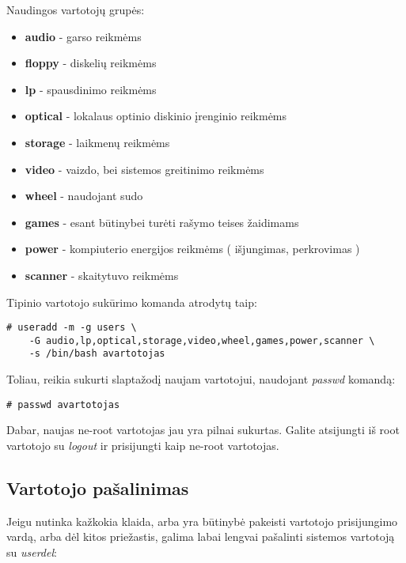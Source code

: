   Naudingos vartotojų grupės:

  \begin{itemize}
    \item \textbf{audio} - garso reikmėms
    \item \textbf{floppy} - diskelių reikmėms
    \item \textbf{lp} - spausdinimo reikmėms
    \item \textbf{optical} - lokalaus optinio diskinio įrenginio
      reikmėms
    \item \textbf{storage} - laikmenų reikmėms
    \item \textbf{video} - vaizdo, bei sistemos greitinimo reikmėms
    \item \textbf{wheel} - naudojant sudo
    \item \textbf{games} - esant būtinybei turėti rašymo teises
      žaidimams
    \item \textbf{power} - kompiuterio energijos reikmėms (
      išjungimas, perkrovimas )
    \item \textbf{scanner} - skaitytuvo reikmėms
  \end{itemize}

  Tipinio vartotojo sukūrimo komanda atrodytų taip:

  \begin{verbatim}
# useradd -m -g users \
    -G audio,lp,optical,storage,video,wheel,games,power,scanner \
    -s /bin/bash avartotojas
  \end{verbatim}

  Toliau, reikia sukurti slaptažodį naujam vartotojui, naudojant
  \textsl{passwd} komandą:

  \begin{verbatim}
# passwd avartotojas
  \end{verbatim}

  Dabar, naujas ne-root vartotojas jau yra pilnai sukurtas. Galite
  atsijungti iš root vartotojo su \textsl{logout} ir prisijungti kaip
  ne-root vartotojas.

    \subsection{Vartotojo pašalinimas}

    
      Jeigu nutinka kažkokia klaida, arba yra būtinybė pakeisti
      vartotojo prisijungimo vardą, arba dėl kitos priežastis, galima
      labai lengvai pašalinti sistemos vartotoją su \textsl{userdel}:
      
